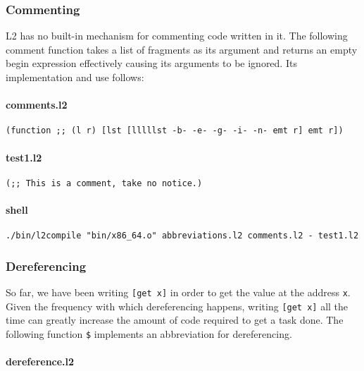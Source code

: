 \documentclass[]{article}
\let\oldparagraph\paragraph
\renewcommand{\paragraph}[1]{\oldparagraph{#1}\mbox{}}
\begin{document}
\hypertarget{commenting}{\subsubsection{Commenting}\label{commenting}}

L2 has no built-in mechanism for commenting code written in it. The
following comment function takes a list of fragments as its argument and
returns an empty begin expression effectively causing its arguments to
be ignored. Its implementation and use follows:

\paragraph{comments.l2}\label{comments.l2}

\begin{verbatim}
(function ;; (l r) [lst [lllllst -b- -e- -g- -i- -n- emt r] emt r])
\end{verbatim}

\paragraph{test1.l2}\label{test1.l2}

\begin{verbatim}
(;; This is a comment, take no notice.)
\end{verbatim}

\paragraph{shell}\label{shell}

\begin{verbatim}
./bin/l2compile "bin/x86_64.o" abbreviations.l2 comments.l2 - test1.l2
\end{verbatim}

\hypertarget{dereferencing}{\subsubsection{Dereferencing}\label{dereferencing}}

So far, we have been writing \texttt{{[}get\ x{]}} in order to get the
value at the address \texttt{x}. Given the frequency with which
dereferencing happens, writing \texttt{{[}get\ x{]}} all the time can
greatly increase the amount of code required to get a task done. The
following function \texttt{\$} implements an abbreviation for
dereferencing.

\paragraph{dereference.l2}\label{dereference.l2}
\end{document}
